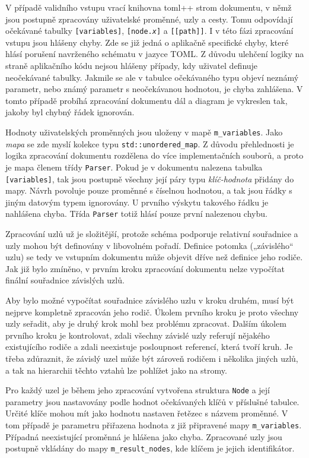 \documentclass[FM,DP]{tulthesis}
\begin{document}
	V případě validního vstupu vrací knihovna toml++ strom dokumentu, v němž jsou postupně zpracovány uživatelské proměnné, uzly a cesty. Tomu odpovídají očekávané tabulky \texttt{[variables]}, \texttt{[node.\textit{x}]} a \texttt{[[path]]}. I v této fázi zpracování vstupu jsou hlášeny chyby. Zde se již jedná o aplikačně specifické chyby, které hlásí porušení navrženého schématu v jazyce TOML. Z důvodu ulehčení logiky na straně aplikačního kódu nejsou hlášeny případy, kdy uživatel definuje neočekávané tabulky. Jakmile se ale v tabulce očekávaného typu objeví neznámý parametr, nebo známý parametr s neočekávanou hodnotou, je chyba zahlášena. V tomto případě probíhá zpracování dokumentu dál a diagram je vykreslen tak, jakoby byl chybný řádek ignorován.
	
	Hodnoty uživatelských proměnných jsou uloženy v mapě \texttt{m\_variables}. Jako \mbox{\textit{mapa}} se zde myslí kolekce typu \texttt{std::unordered\_map}. Z důvodu přehlednosti je \mbox{logika} zpracování dokumentu rozdělena do více implementačních souborů, a proto je mapa členem třídy \texttt{Parser}. Pokud je v dokumentu nalezena tabulka \texttt{[variables]}, tak jsou postupně všechny její páry typu \textit{klíč-hodnota} přidány do mapy. Návrh povoluje pouze proměnné s číselnou hodnotou, a tak jsou řádky s jiným datovým typem ignorovány. U prvního výskytu takového řádku je nahlášena chyba. Třída \texttt{Parser} totiž hlásí pouze první nalezenou chybu.	
	
	Zpracování uzlů už je složitější, protože schéma podporuje relativní souřadnice a uzly mohou být definovány v libovolném pořadí. Definice potomka („závislého“ uzlu) se tedy ve vstupním dokumentu může objevit dříve než definice jeho rodiče. Jak již bylo zmíněno, v prvním kroku zpracování dokumentu nelze vypočítat finální souřadnice závislých uzlů.
	
	Aby bylo možné vypočítat souřadnice závislého uzlu v kroku druhém, musí být nejprve kompletně zpracován jeho rodič. Úkolem prvního kroku je proto všechny uzly seřadit, aby je druhý krok mohl bez problému zpracovat.	Dalším úkolem prvního kroku je kontrolovat, zdali všechny závislé uzly referují nějakého existujícího rodiče a zdali neexistuje posloupnost referencí, která tvoří kruh. Je třeba zdůraznit, že závislý uzel může být zároveň rodičem i několika jiných uzlů, a tak na hierarchii těchto vztahů lze pohlížet jako na stromy.
	
	Pro každý uzel je během jeho zpracování vytvořena struktura \texttt{Node} a její parametry jsou nastavovány podle hodnot očekávaných klíčů v příslušné tabulce. Určité klíče mohou mít jako hodnotu nastaven řetězec s názvem proměnné. V tom případě je parametru přiřazena hodnota z již připravené mapy \texttt{m\_variables}. Případná \mbox{neexistující} proměnná je hlášena jako chyba. Zpracované uzly jsou postupně vkládány do mapy \texttt{m\_result\_nodes}, kde klíčem je jejich identifikátor.
	
\end{document}
